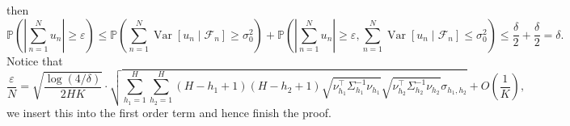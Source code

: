 \documentclass{article}
\numberwithin{equation}{section}
\theoremstyle{plain}
\theoremstyle{definition}
\theoremstyle{remark}
\begin{document}
then
\begin{equation*}
    \mathbb{P}\left(\left|\sum_{n=1}^N u_n\right| \geq \varepsilon \right) \leq \mathbb{P}\left(\sum_{n=1}^{N} \operatorname{Var}\left[u_{n} \mid \mathcal{F}_{n}\right] \geq \sigma^2_0 \right) + \mathbb{P}\left(\left|\sum_{n=1}^N u_n\right| \geq \varepsilon, \sum_{n=1}^{N} \operatorname{Var}\left[u_{n} \mid \mathcal{F}_{n}\right] \leq \sigma^2_0\right) \leq \frac{\delta}{2} + \frac{\delta}{2} = \delta.
\end{equation*}
Notice that
\begin{equation*}
    \frac{\varepsilon}{N} = \sqrt{\frac{\log(4 / \delta)}{2HK}} \cdot \sqrt{\sum_{h_{1}=1}^{H} \sum_{h_{2}=1}^{H}\left(H-h_{1}+1\right)\left(H-h_{2}+1\right) \sqrt{\nu_{h_{1}}^{\top} \Sigma_{h_{1}}^{-1} \nu_{h_{1}}} \sqrt{\nu_{h_{2}}^{\top} \Sigma_{h_{2}}^{-1} \nu_{h_{2}}} \sigma_{h_1,h_2}} + O(\frac{1}{K}),
\end{equation*}
we insert this into the first order term and hence finish the proof.
\end{document}

